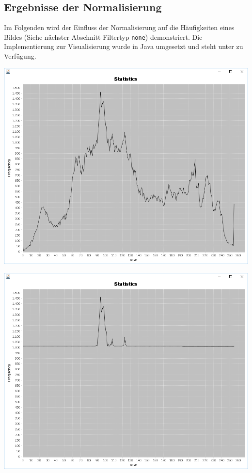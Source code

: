 \documentclass[a4paper,12pt]{article}
\begin{document}
\subsection{Ergebnisse der Normalisierung}
Im Folgenden wird der Einfluss der Normalisierung auf die Häufigkeiten eines Bildes (Siehe nächster Abschnitt Filtertyp {\tt{none}}) demonstriert.
Die Implementierung zur Visualisierung wurde in Java umgesetzt und steht unter \cite{Haubold} zu Verfügung.
\par
\begin{center}
\includegraphics[width=0.8\linewidth,height=0.7\textheight]{Normalization/lena_unnormalized}
\end{center}
\begin{center}
\includegraphics[width=0.8\linewidth,height=0.7\textheight]{Normalization/lena_normalized}
\end{center}
\end{document}
